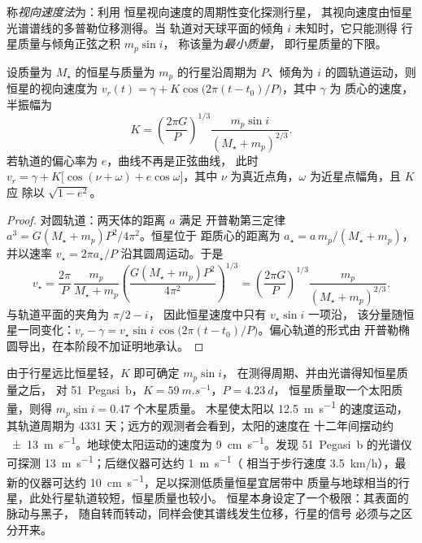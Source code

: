 \begin{definition}\label{def:b3:exoplanets:rv}
称\emph{视向速度法}为：利用
恒星视向速度的周期性变化探测行星，
其视向速度由恒星光谱谱线的多普勒位移测得。当
轨道对天球平面的倾角 $i$ 未知时，它只能测得
行星质量与倾角正弦之积 $m_p\sin i$，
称该量为\emph{最小质量}，
即行星质量的下限。
\end{definition}

\begin{theorem}[视向速度半振幅]\label{thm:b3:exoplanets:semi-amplitude}
设质量为 $M_\star$ 的恒星与质量为 $m_p$ 的行星沿周期为
$P$、倾角为 $i$ 的圆轨道运动，则恒星的视向速度为
$v_r(t) = \gamma + K\cos\bigl(2\pi(t - t_0)/P\bigr)$，其中 $\gamma$ 为
质心的速度，半振幅为
\[
K = \left(\frac{2\pi G}{P}\right)^{1/3}
    \frac{m_p\sin i}{(M_\star + m_p)^{2/3}} .
\]
若轨道的偏心率为 $e$，曲线不再是正弦曲线，
此时 $v_r = \gamma + K\bigl[\cos(\nu + \omega) + e\cos\omega\bigr]$，其中 $\nu$
为真近点角，$\omega$ 为近星点幅角，且 $K$ 应
除以 $\sqrt{1 - e^2}$。
\end{theorem}

\begin{proof}
对圆轨道：两天体的距离 $a$ 满足
开普勒第三定律 $a^3 = G(M_\star + m_p)P^2/4\pi^2$。恒星位于
距质心的距离为 $a_\star = a\,m_p/(M_\star + m_p)$，
并以速率 $v_\star = 2\pi a_\star/P$ 沿其圆周运动。于是
\[
v_\star = \frac{2\pi}{P}\,\frac{m_p}{M_\star + m_p}
          \left(\frac{G(M_\star + m_p)P^2}{4\pi^2}\right)^{1/3}
        = \left(\frac{2\pi G}{P}\right)^{1/3}\frac{m_p}{(M_\star + m_p)^{2/3}} .
\]
与轨道平面的夹角为 $\pi/2 - i$，
因此恒星速度中只有 $v_\star\sin i$ 一项沿，
该分量随恒星一同变化：$v_r - \gamma = v_\star\sin i\,
\cos\bigl(2\pi(t - t_0)/P\bigr)$。偏心轨道的形式由
开普勒椭圆导出，在本阶段不加证明地承认。
\end{proof}

由于行星远比恒星轻，$K$ 即可确定 $m_p\sin i$，
在测得周期、并由光谱得知恒星质量之后，
对 51~Pegasi~b，$K = \qty{59}{m.s^{-1}}$，$P = \qty{4.23}{d}$，
恒星质量取一个太阳质量，则得 $m_p\sin i = 0.47$ 个木星质量。
木星使太阳以 \qty{12.5}{m.s^{-1}} 的速度运动，其轨道周期为
\num{4331} 天；远方的观测者会看到，太阳的速度在
十二年间摆动约 \qty{\pm 13}{m.s^{-1}}。地球使太阳运动的速度为
\qty{9}{cm.s^{-1}}。发现 51~Pegasi~b 的光谱仪可探测
\qty{13}{m.s^{-1}}；后继仪器可达约 \qty{1}{m.s^{-1}}（
相当于步行速度 \qty{3.5}{km/h}），最新的仪器可达约
\qty{10}{cm.s^{-1}}，足以探测低质量恒星宜居带中
质量与地球相当的行星，此处行星轨道较短，恒星质量也较小。
恒星本身设定了一个极限：其表面的脉动与黑子，
随自转而转动，同样会使其谱线发生位移，行星的信号
必须与之区分开来。

